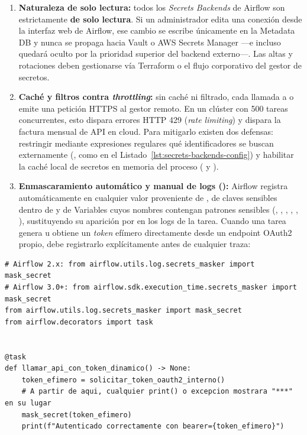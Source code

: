 \begin{enumerate}
  \item \textbf{Naturaleza de solo lectura:} todos los \textit{Secrets Backends} de Airflow son estrictamente \textbf{de solo lectura}. Si un administrador edita una conexión desde la interfaz web de Airflow, ese cambio se escribe únicamente en la Metadata DB y nunca se propaga hacia Vault o AWS Secrets Manager ---e incluso quedará oculto por la prioridad superior del backend externo---. Las altas y rotaciones deben gestionarse vía Terraform o el flujo corporativo del gestor de secretos.
  \item \textbf{Caché y filtros  contra \textit{throttling}:} sin caché ni filtrado, cada llamada a  o  emite una petición HTTPS al gestor remoto. En un clúster con 500 tareas concurrentes, esto dispara errores HTTP 429 (\textit{rate limiting}) y dispara la factura mensual de API en cloud. Para mitigarlo existen dos defensas: restringir mediante expresiones regulares qué identificadores se buscan externamente (, como en el Listado~\ref{lst:secrets-backends-config}) y habilitar la caché local de secretos en memoria del proceso ( y ).
  \item \textbf{Enmascaramiento automático y manual de logs ():} Airflow registra automáticamente en  cualquier valor proveniente de , de claves sensibles dentro de  y de Variables cuyos nombres contengan patrones sensibles (, , , , , ), sustituyendo su aparición por \code{***} en los logs de la tarea. Cuando una tarea genera u obtiene un \textit{token} efímero directamente desde un endpoint OAuth2 propio, debe registrarlo explícitamente antes de cualquier traza:
\end{enumerate}

\begin{lstlisting}[style=python, caption={Registro explícito de un secreto dinámico obtenido en tiempo de ejecución para enmascararlo en logs.}, label={lst:mask-secret}]
# Airflow 2.x: from airflow.utils.log.secrets_masker import mask_secret
# Airflow 3.0+: from airflow.sdk.execution_time.secrets_masker import mask_secret
from airflow.utils.log.secrets_masker import mask_secret
from airflow.decorators import task


@task
def llamar_api_con_token_dinamico() -> None:
    token_efimero = solicitar_token_oauth2_interno()
    # A partir de aqui, cualquier print() o excepcion mostrara "***" en su lugar
    mask_secret(token_efimero)
    print(f"Autenticado correctamente con bearer={token_efimero}")
\end{lstlisting}


